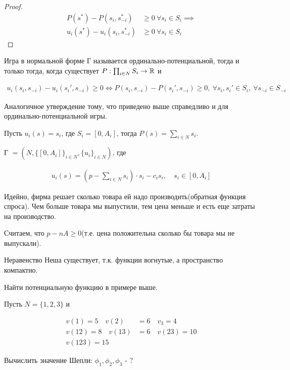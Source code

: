 \documentclass[../main.tex]{subfiles}
\begin{document}
\begin{proof}
	\begin{align*}
		P(s^*) - P(s_i, s_{-i}^*) &\geqslant 0 \ \forall s_i \in S_i \implies \\
		u_i(s^*) - u_i(s_i, s^*_{-i}) &\geqslant 0 \ \forall s_i \in S_i
	\end{align*}
\end{proof}

\begin{df}
	Игра в нормальной форме Г называется ординально-потенциальной, тогда и только тогда, когда существует $P: \prod_{i \in N} S_i \to \mathbb{R}$ и

	\begin{align*}
		u_i(s_i, s_{-i}) - u_i(s_i', s_{-i}) \geqslant 0 \iff P(s_i, s_{-i}) - P(s_i', s_{-i}) \geqslant 0, \ \forall s_i, s_i' \in S_i, \ \forall s_{-i} \in S_{-i}
	\end{align*}

	Аналогичное утверждение тому, что приведено выше справедливо и для ординально-потенциальной игры.
\end{df}

\begin{exmpl}
	Пусть $u_i(s) = s_i$, где  $S_i = [0, A_i]$, тогда  $P(s) = \sum_{i \in N} s_i$.
\end{exmpl}

\begin{exmpl}

	Г $= (N, \{[0, A_i]\}_{i \in N}, \{u_i\}_{i \in N})$, где

	\begin{align*}
		u_i(s) = (p - \sum_{i \in N} s_i) \cdot s_i - c_i s_i, \quad s_i \in [0, A_i]
	\end{align*}

	Идейно, фирма решает сколько товара ей надо производить(обратная функция спроса).
	Чем больше товара мы выпустили, тем цена меньше и есть еще затраты на производство.

	Считаем, что $p - n A \geqslant 0$(т.е. цена положительна сколько бы товара мы не выпускали).

	Неравенство Неша существует, т.к. функции вогнутые, а пространство компактно.

\end{exmpl}

\begin{problem}
	Найти потенциальную функцию в примере выше.
\end{problem}

\begin{problem}
	Пусть $N = \{1, 2, 3\}$ и 

	\begin{align*}
		v(1) = 5 \quad v(2) &= 6 \quad v_3 = 4 \\
		v(12) = 8 \quad v(13) &= 6 \quad v(23) = 10 \\
		v(123) = 15
	\end{align*}

	Вычислить значение Шепли:  $\phi_1, \phi_2, \phi_3$ - ?

\end{problem}
\end{document}

